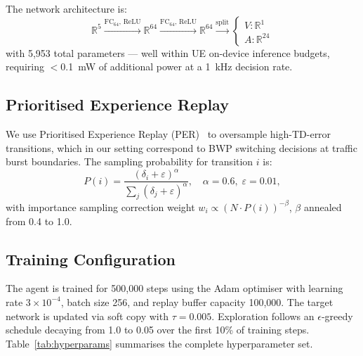 \documentclass[conference]{IEEEtran}
\begin{document}
The network architecture is:
\begin{equation*}
  \mathbb{R}^5 \xrightarrow{\mathrm{FC}_{64},\,\mathrm{ReLU}}
  \mathbb{R}^{64} \xrightarrow{\mathrm{FC}_{64},\,\mathrm{ReLU}}
  \mathbb{R}^{64} \xrightarrow{\mathrm{split}}
  \begin{cases} V: \mathbb{R}^1 \\ A: \mathbb{R}^{24} \end{cases}
\end{equation*}
with 5,953 total parameters — well within UE on-device inference budgets,
requiring $<$0.1~mW of additional power at a 1~kHz decision rate.

\subsection{Prioritised Experience Replay}

We use Prioritised Experience Replay (PER)~\cite{schaul2016per} to
oversample high-TD-error transitions, which in our setting correspond
to BWP switching decisions at traffic burst boundaries.
The sampling probability for transition $i$ is:
\begin{equation}
  P(i) = \frac{(\delta_i + \varepsilon)^\alpha}
              {\sum_j (\delta_j + \varepsilon)^\alpha},
  \quad \alpha = 0.6,\; \varepsilon = 0.01,
  \label{eq:per}
\end{equation}
with importance sampling correction weight
$w_i \propto (N \cdot P(i))^{-\beta}$, $\beta$ annealed from 0.4 to 1.0.

\subsection{Training Configuration}

The agent is trained for 500,000 steps using the Adam optimiser with
learning rate $3 \times 10^{-4}$, batch size 256, and replay buffer
capacity 100,000.
The target network is updated via soft copy with $\tau = 0.005$.
Exploration follows an $\epsilon$-greedy schedule decaying from 1.0 to
0.05 over the first 10\% of training steps.
Table~\ref{tab:hyperparams} summarises the complete hyperparameter set.
\end{document}
